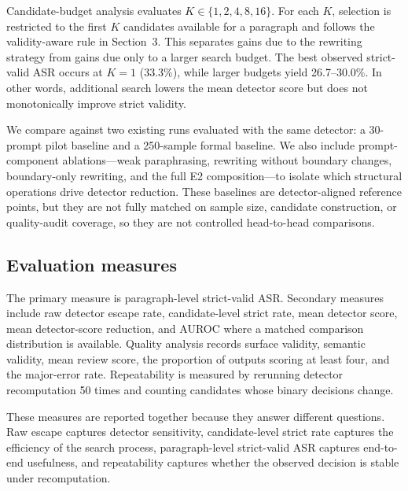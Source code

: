 Candidate-budget analysis evaluates $K\in\{1,2,4,8,16\}$. For each $K$, selection is restricted to the first $K$ candidates available for a paragraph and follows the validity-aware rule in Section~3. This separates gains due to the rewriting strategy from gains due only to a larger search budget. The best observed strict-valid ASR occurs at $K=1$ (33.3\%), while larger budgets yield 26.7--30.0\%. In other words, additional search lowers the mean detector score but does not monotonically improve strict validity.

We compare against two existing runs evaluated with the same detector: a 30-prompt pilot baseline and a 250-sample formal baseline. We also include prompt-component ablations---weak paraphrasing, rewriting without boundary changes, boundary-only rewriting, and the full E2 composition---to isolate which structural operations drive detector reduction. These baselines are detector-aligned reference points, but they are not fully matched on sample size, candidate construction, or quality-audit coverage, so they are not controlled head-to-head comparisons.

\subsection{Evaluation measures}

The primary measure is paragraph-level strict-valid ASR. Secondary measures include raw detector escape rate, candidate-level strict rate, mean detector score, mean detector-score reduction, and AUROC where a matched comparison distribution is available. Quality analysis records surface validity, semantic validity, mean review score, the proportion of outputs scoring at least four, and the major-error rate. Repeatability is measured by rerunning detector recomputation 50 times and counting candidates whose binary decisions change.

These measures are reported together because they answer different questions. Raw escape captures detector sensitivity, candidate-level strict rate captures the efficiency of the search process, paragraph-level strict-valid ASR captures end-to-end usefulness, and repeatability captures whether the observed decision is stable under recomputation.
